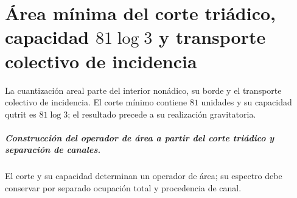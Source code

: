 \chapter{Área mínima del corte triádico, capacidad \texorpdfstring{\(81\log 3\)}{81 log 3} y transporte colectivo de incidencia}
\label{chap:parte-iv-58}

La cuantización areal parte del interior nonádico, su borde y el transporte colectivo de incidencia. El corte mínimo contiene \(81\) unidades y su capacidad qutrit es \(81\log 3\); el resultado precede a su realización gravitatoria.



\paragraph{Construcción del operador de área a partir del corte triádico y separación de canales.} El corte y su capacidad determinan un operador de área; su espectro debe conservar por separado ocupación total y procedencia de canal.
